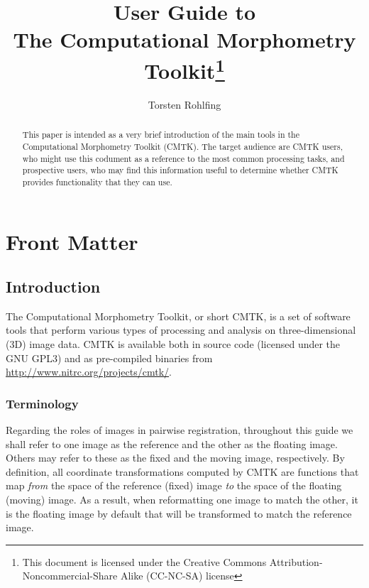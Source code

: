 \documentclass{InsightArticle}
\title{User Guide to \\[4mm] The Computational Morphometry
  Toolkit\footnote{This document is licensed under
    the Creative Commons Attribution-Noncommercial-Share Alike (CC-NC-SA) license}}
\author{Torsten Rohlfing}
\begin{document}
\ifpdf
\else
\fi


\maketitle

\ifhtml
\chapter*{Front Matter\label{front}}
\fi


\begin{abstract}
\noindent
This paper is intended as a very brief introduction of the main tools in the
Computational Morphometry Toolkit (CMTK). The target audience are CMTK users,
who might use this codument as a reference to the most common processing
tasks, and prospective users, who may find this information useful to
determine whether CMTK provides functionality that they can use.
\end{abstract}

\clearpage
\tableofcontents
\clearpage


\section{Introduction}

The Computational Morphometry Toolkit, or short CMTK, is a set of software
tools that perform various types of processing and analysis on
three-dimensional (3D) image data. CMTK is available both in source code
(licensed under the GNU GPL3) and as pre-compiled binaries from
\url{http://www.nitrc.org/projects/cmtk/}.

\subsection{Terminology}

Regarding the roles of images in pairwise registration, throughout this guide we shall
refer to one image as the reference and the other as the floating
image. Others may refer to these as the fixed and the moving image,
respectively. By definition, all coordinate transformations computed by CMTK
are functions that map {\em from\/} the space of the reference (fixed) image
{\em to\/} the space of the floating (moving) image. As a result, when
reformatting one image to match the other, it is the floating image by default
that will be transformed to match the reference image.
\end{document}
